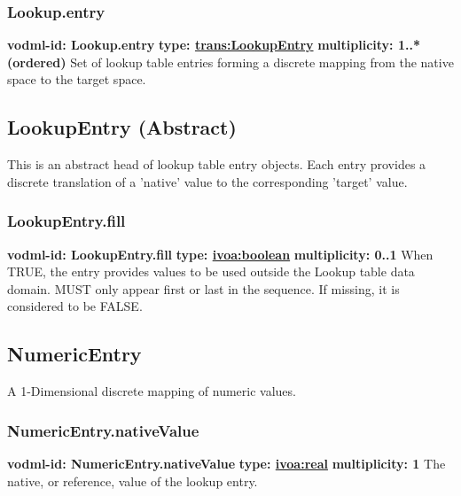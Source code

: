     \subsubsection{Lookup.entry}
      \textbf{vodml-id: Lookup.entry} \newline
      \textbf{type: \hyperref[sect:LookupEntry]{trans:LookupEntry}} \newline
      \textbf{multiplicity: 1..*  (ordered)} \newline 
      Set of lookup table entries forming a discrete mapping from the native space to the target space.

  \subsection{LookupEntry (Abstract)}
  \label{sect:LookupEntry}
    This is an abstract head of lookup table entry objects. Each entry provides a discrete translation of a 'native' value to the corresponding 'target' value.

    \subsubsection{LookupEntry.fill}
      \textbf{vodml-id: LookupEntry.fill} \newline
      \textbf{type: \hyperref[sect:ivoa]{ivoa:boolean}} \newline
      \textbf{multiplicity: 0..1} \newline 
      When TRUE, the entry provides values to be used outside the Lookup table data domain. MUST only appear first or last in the sequence. If missing, it is considered to be FALSE.

  \subsection{NumericEntry}
  \label{sect:NumericEntry}
    A 1-Dimensional discrete mapping of numeric values.

    \subsubsection{NumericEntry.nativeValue}
      \textbf{vodml-id: NumericEntry.nativeValue} \newline
      \textbf{type: \hyperref[sect:ivoa]{ivoa:real}} \newline
      \textbf{multiplicity: 1} \newline 
      The native, or reference, value of the lookup entry.

